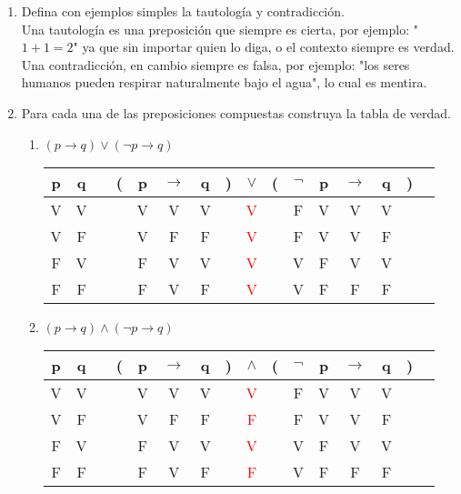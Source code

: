\documentclass[a4paper,10pt]{article}
\title{}
\author{}
\begin{document}
\maketitle

\begin{enumerate}
 \item Defina con ejemplos simples la tautología y contradicción.
 \\ Una tautología es una preposición que siempre es cierta, por ejemplo: "$1+1=2$" ya que sin importar quien lo diga, o el contexto siempre es verdad.
 \\ Una contradicción, en cambio siempre es falsa, por ejemplo: "los seres humanos pueden respirar naturalmente bajo el agua", lo cual es mentira.
 
 \item Para cada una de las preposiciones compuestas construya la tabla de verdad.
\begin{enumerate}[label=\alph*]
 \item $(p\to q)\lor(\neg p\to q)$
 \\\begin{tabular}{@{ }c@{ }@{ }c | c@{ }@{}c@{}@{ }c@{ }@{ }c@{ }@{ }c@{ }@{}c@{}@{ }c@{ }@{}c@{}@{ }c@{ }@{ }c@{ }@{ }c@{ }@{ }c@{ }@{}c@{}@{ }c}
p & q &  & ( & p & $\rightarrow$ & q & ) & $\lor$ & ( & $\neg$ & p & $\rightarrow$ & q & ) & \\
\hline 
V & V &  &  & V & V & V &  & \textcolor{red}{V} &  & F & V & V & V &  & \\
V & F &  &  & V & F & F &  & \textcolor{red}{V} &  & F & V & V & F &  & \\
F & V &  &  & F & V & V &  & \textcolor{red}{V} &  & V & F & V & V &  & \\
F & F &  &  & F & V & F &  & \textcolor{red}{V} &  & V & F & F & F &  & \\
\end{tabular}

\item $(p\to q)\land(\neg p\to q)$
\\\begin{tabular}{@{ }c@{ }@{ }c | c@{ }@{}c@{}@{ }c@{ }@{ }c@{ }@{ }c@{ }@{}c@{}@{ }c@{ }@{}c@{}@{ }c@{ }@{ }c@{ }@{ }c@{ }@{ }c@{ }@{}c@{}@{ }c}
p & q &  & ( & p & $\rightarrow$ & q & ) & $\land$ & ( & $\neg$ & p & $\rightarrow$ & q & ) & \\
\hline 
V & V &  &  & V & V & V &  & \textcolor{red}{V} &  & F & V & V & V &  & \\
V & F &  &  & V & F & F &  & \textcolor{red}{F} &  & F & V & V & F &  & \\
F & V &  &  & F & V & V &  & \textcolor{red}{V} &  & V & F & V & V &  & \\
F & F &  &  & F & V & F &  & \textcolor{red}{F} &  & V & F & F & F &  & \\
\end{tabular}
\end{enumerate}


\end{enumerate}
\end{document}
